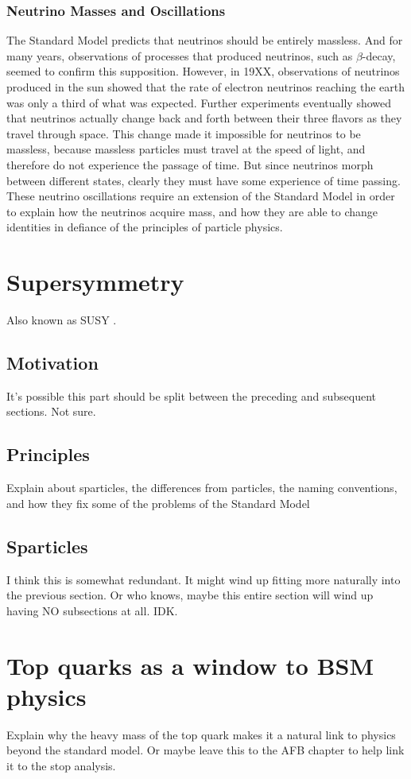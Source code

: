 \subsubsection*{Neutrino Masses and Oscillations}
The Standard Model predicts that neutrinos should be entirely
massless. And for many years, observations of processes that produced
neutrinos, such as $\beta$-decay, seemed to confirm this
supposition. However, in 19XX, observations of neutrinos produced in %
the sun showed that the rate of electron neutrinos reaching the earth
was only a third of what was expected. Further experiments eventually
showed that neutrinos actually change back and forth between their three %
flavors as they travel through space. This change made it impossible
for neutrinos to be massless, because massless particles must travel
at the speed of light, and therefore do not experience the passage of
time. But since neutrinos morph between different states, clearly they
must have some experience of time passing. These neutrino
oscillations require an extension of the Standard Model in order to
explain how the neutrinos acquire mass, and how they are able to
change identities in defiance of the principles of particle physics.

\section{Supersymmetry}
\label{sec:susy}

Also known as SUSY \cite{susyprimer}.

\subsection{Motivation}
\label{ssec:susymotivation}

It's possible this part should be split between the preceding and
subsequent sections. Not sure.

\subsection{Principles}
\label{ssec:susyprinciples}

Explain about sparticles, the differences from particles,
the naming conventions, and how they fix some of the problems
of the Standard Model

\subsection{Sparticles}
\label{ssec:susysparticles}

I think this is somewhat redundant. It might wind up fitting more
naturally into the previous section. Or who knows, maybe this entire
section will wind up having NO subsections at all. IDK.

\section{Top quarks as a window to BSM physics}
\label{sec:topquarks}

Explain why the heavy mass of the top quark makes it a natural link
to physics beyond the standard model.
Or maybe leave this to the AFB chapter to help link it to the stop
analysis.

